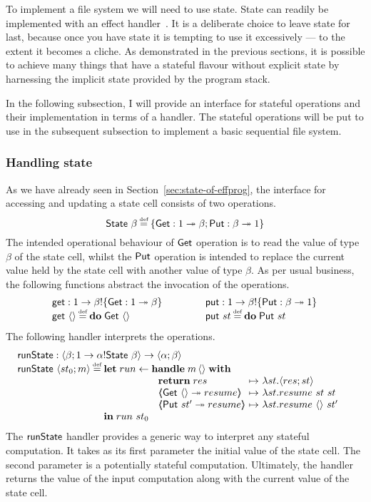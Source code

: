 \documentclass[12pt,phd,lfcs,twoside,openright,logo,leftchapter,normalheadings]{infthesis}
\theoremstyle{plain}
\theoremstyle{definition}
\begin{document}
To implement a file system we will need to use state. State can
readily be implemented with an effect handler~\cite{KammarLO13}.
%
It is a deliberate choice to leave state for last, because once you
have state it is tempting to use it excessively --- to the extent it
becomes a cliche.
%
As demonstrated in the previous sections, it is possible to achieve
many things that have a stateful flavour without explicit state by
harnessing the implicit state provided by the program stack.

In the following subsection, I will provide an interface for stateful
operations and their implementation in terms of a handler. The
stateful operations will be put to use in the subsequent subsection to
implement a basic sequential file system.

\subsubsection{Handling state}

As we have already seen in Section~\ref{sec:state-of-effprog}, the
interface for accessing and updating a state cell consists of two
operations.
%
\[
  \State~\beta \defas \{\Get:\UnitType \opto \beta;\Put:\beta \opto \UnitType\}
\]
%
The intended operational behaviour of $\mathsf{Get}$ operation is to read the
value of type $\beta$ of the state cell, whilst the $\mathsf{Put}$ operation
is intended to replace the current value held by the state cell with
another value of type $\beta$. As per usual business, the following
functions abstract the invocation of the operations.
%
\[
  \ba{@{~}l@{\quad\qquad\quad}c@{~}l}
    \Uget : \UnitType \to \beta \eff \{\Get:\UnitType \opto \beta\}
    & &
    \Uput : \UnitType \to \beta \eff \{\Put:\beta \opto \UnitType\}\\
    \Uget~\Unit \defas \Do\;\Get~\Unit
    & &
    \Uput~st \defas \Do\;\Put~st
  \el
\]
%
The following handler interprets the operations.
%
\[
  \bl
    \runState : \Record{\beta;\UnitType \to \alpha \eff \State~\beta} \to \Record{\alpha;\beta}\\
    \runState~\Record{st_0;m} \defas
        \ba[t]{@{}l}
           \Let\;run \revto
              \ba[t]{@{}l}
                \Handle\;m\,\Unit\;\With\\
                 ~\ba{@{~}l@{~}c@{~}l}
                   \Return\;res      &\mapsto& \lambda st.\Record{res;st}\\
                   \OpCase{\Get}{\Unit}{resume} &\mapsto& \lambda st.resume~st~st\\
                   \OpCase{\Put}{st'}{resume}   &\mapsto& \lambda st.resume~\Unit~st'
                  \ea
              \ea\\
           \In\;run~st_0
        \ea
  \el
\]
%
The $\mathsf{runState}$ handler provides a generic way to interpret any
stateful computation. It takes as its first parameter the initial
value of the state cell. The second parameter is a potentially
stateful computation. Ultimately, the handler returns the value of the
input computation along with the current value of the state cell.
\end{document}
